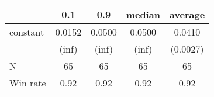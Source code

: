 \begin{tabular}{lcccc}
\hline
         &  0.1   &  0.9   & median & average   \\
\midrule
\midrule
constant & 0.0152 & 0.0500 & 0.0500 & 0.0410    \\
         & (inf)  & (inf)  & (inf)  & (0.0027)  \\
N        & 65     & 65     & 65     & 65        \\
Win rate & 0.92   & 0.92   & 0.92   & 0.92      \\
\hline
\end{tabular}